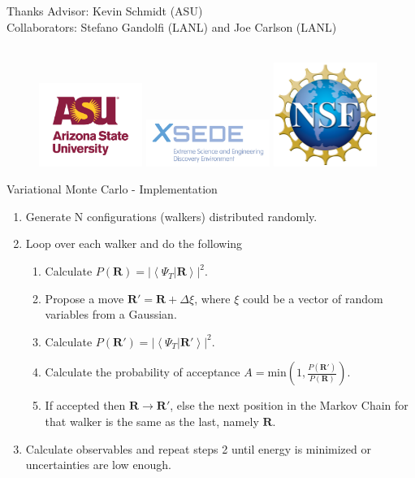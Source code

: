 \documentclass{beamer}
\newcommand{\braket}[2]{\left< #1 | #2 \right>}
\newcommand{\R}{\mathbf{R}}
\begin{document}
\begin{frame}{Thanks}
Advisor: Kevin Schmidt (ASU) \\
Collaborators: Stefano Gandolfi (LANL) and Joe Carlson (LANL)
\\~\\
\begin{figure}[h]
   \centering
   \includegraphics[width=0.30\textwidth]{asu_university_vert_rgb_maroongold_150.png}
   \includegraphics[width=0.36\textwidth]{xsede-full-color.jpg}
   \includegraphics[width=0.30\textwidth]{NSF_4-Color_bitmap_Logo.png}
\end{figure}
\end{frame}

\iftrue
\appendix
\begin{frame}{Variational Monte Carlo - Implementation}
\begin{enumerate}
   \item Generate N configurations (walkers) distributed randomly.
   \item Loop over each walker and do the following
   \begin{enumerate}
      \setlength\itemsep{0.2em}
      \item Calculate $P(\R) = \left|\braket{\Psi_T}{\R}\right|^2$.
      \item Propose a move $\R' = \R + \Delta\xi$, where $\xi$ could be a vector of random variables from a Gaussian.
      \item Calculate $P(\R') = \left|\braket{\Psi_T}{\R'}\right|^2$.
      \item Calculate the probability of acceptance $A=\mathrm{min}\left(1,\frac{P(\R')}{P(\R)}\right)$.
      \item If accepted then $\R \rightarrow \R'$, else the next position in the Markov Chain for that walker is the same as the last, namely $\R$.
   \end{enumerate}
   \item Calculate observables and repeat steps 2 until energy is minimized or uncertainties are low enough.
\end{enumerate}
\end{frame}
\end{document}
